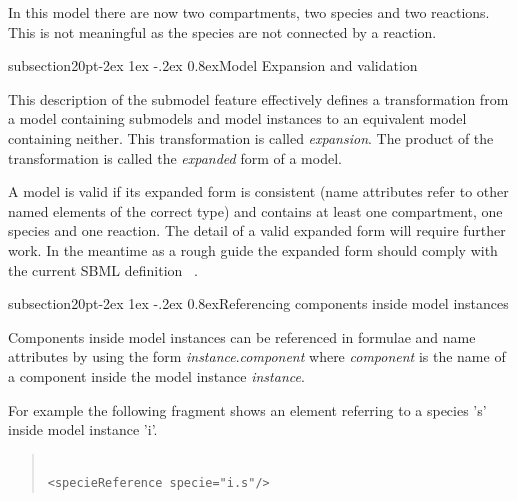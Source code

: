 \documentclass[10pt]{article}
\makeatletter
\renewcommand{\subsection}{\@startsection%
  {subsection}{2}{0pt}{-2ex \@plus 1ex \@minus -.2ex}%
  {0.8ex}{\slshape\large\bfseries\sffamily}}
\newcommand{\tightspacing}{\renewcommand{\baselinestretch}{0.85}}
\newcommand{\regularspacing}{\renewcommand{\baselinestretch}{1.0}}
\makeatother
\begin{document}
In this model there are now two compartments, two species and two
reactions. This is not meaningful as the species are not
connected by a reaction.

\subsection{Model Expansion and validation}
\label{sec:expansion}

This description of the submodel feature effectively defines a
transformation from a model containing submodels and model instances to
an equivalent model containing neither.  This transformation is
called \emph{expansion}.  The product of the transformation is
called the \emph{expanded} form of a model.

A model is valid if its expanded form is consistent (name
attributes refer to other named elements of the correct type) and
contains at least one compartment, one species and one reaction.
The detail of a valid expanded form will require further work.
In the meantime as a rough guide the expanded form should comply with the
current SBML definition ~\cite{Finney:SBMLv1}.

\subsection{Referencing components inside model instances}

Components inside model instances can be referenced in formulae and name
attributes by using the form \emph{instance}.\emph{component}
where \emph{component} is the name of a component inside the
model instance \emph{instance}.

For example the following fragment shows an element referring to
a species 's' inside model instance 'i'.

\begin{quote}

  \begin{small}

    \tightspacing

\begin{verbatim}

<specieReference specie="i.s"/>

\end{verbatim}

    \regularspacing

  \end{small}

\end{quote}
\end{document}
